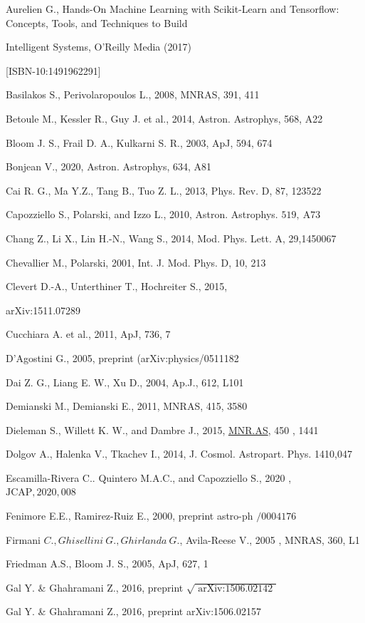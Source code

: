 \documentclass[10pt, a4paper]{article}
\begin{document}
Aurelien G., Hands-On Machine Learning with Scikit-Learn and Tensorflow: Concepts, Tools, and Techniques to Build

Intelligent Systems, O'Reilly Media (2017)

[ISBN-10:1491962291]

Basilakos S., Perivolaropoulos L., 2008, MNRAS, 391, 411

Betoule M., Kessler R., Guy J. et al., 2014, Astron. Astrophys, 568, A22

Bloom J. S., Frail D. A., Kulkarni S. R., 2003, ApJ, 594, 674

Bonjean V., 2020, Astron. Astrophys, 634, A81

Cai R. G., Ma Y.Z., Tang B., Tuo Z. L., 2013, Phys. Rev. D, 87, 123522

Capozziello S., Polarski, and Izzo L., 2010, Astron. Astrophys. $519, \mathrm{~A} 73$

Chang Z., Li X., Lin H.-N., Wang S., 2014, Mod. Phys. Lett. A, 29,1450067

Chevallier M., Polarski, 2001, Int. J. Mod. Phys. D, 10, 213

Clevert D.-A., Unterthiner $\mathrm{T}$., Hochreiter S., 2015,

arXiv:1511.07289

Cucchiara A. et al., 2011, ApJ, 736, 7

D'Agostini G., 2005, preprint (arXiv:physics/0511182

Dai Z. G., Liang E. W., Xu D., 2004, Ap.J., 612, L101

Demianski M., Demianski E., 2011, MNRAS, 415, 3580

Dieleman S., Willett $\mathrm{K}$. W., and Dambre J., 2015, \href{http://MNR.AS}{MNR.AS}, 450 , 1441

Dolgov A., Halenka V., Tkachev I., 2014, J. Cosmol. Astropart. Phys. 1410,047

Escamilla-Rivera C.. Quintero M.A.C., and Capozziello S., 2020 , $\mathrm{JCAP}, 2020,008$

Fenimore E.E., Ramirez-Ruiz E., 2000, preprint astro-ph $/ 0004176$

Firmani $C ., G h i s e l l i n i ~ G ., G h i r l a n d a ~ G .$, Avila-Reese V., 2005 , MNRAS, 360, L1

Friedman A.S., Bloom J. S., 2005, ApJ, 627, 1

Gal Y. \& Ghahramani Z., 2016, preprint $\sqrt{\text { arXiv:1506.02142 }}$

Gal Y. \& Ghahramani Z., 2016, preprint arXiv:1506.02157
\end{document}
